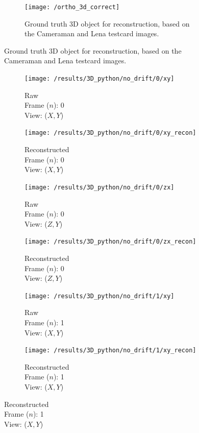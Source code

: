 \begin{figure}
    \begin{subfigure}[t]{\linewidth}
        \centering
        \texttt{[image: /ortho\_3d\_correct]}
        \caption{Ground truth \gls{3D} object for reconstruction, based on the Cameraman and Lena testcard images.}
        \label{fig:ortho_3d_correct}
    \end{subfigure}
\end{figure}
\begin{figure}
\ContinuedFloat
    \begin{subfigure}[t]{0.2\linewidth}
        \centering
        \texttt{[image: /results/3D\_python/no\_drift/0/xy]}\caption{Raw\\Frame (\(n\)): 0\\View: (\(X,Y\))}
    \end{subfigure}\hfill
    \begin{subfigure}[t]{0.2\linewidth}
        \centering
        \texttt{[image: /results/3D\_python/no\_drift/0/xy\_recon]}\caption{Reconstructed\\Frame (\(n\)): 0\\View: (\(X,Y\))}
    \end{subfigure}\hfill
    \begin{subfigure}[t]{0.2\linewidth}
        \centering
        \texttt{[image: /results/3D\_python/no\_drift/0/zx]}\caption{Raw\\Frame (\(n\)): 0\\View: (\(Z,Y\))}
    \end{subfigure}\hfill
    \begin{subfigure}[t]{0.2\linewidth}
        \centering
        \texttt{[image: /results/3D\_python/no\_drift/0/zx\_recon]}\caption{Reconstructed\\Frame (\(n\)): 0\\View: (\(Z,Y\))}
    \end{subfigure}
    \begin{subfigure}[t]{0.2\linewidth}
        \centering
        \texttt{[image: /results/3D\_python/no\_drift/1/xy]}\caption{Raw\\Frame (\(n\)): 1\\View: (\(X,Y\))}
    \end{subfigure}\hfill
    \begin{subfigure}[t]{0.2\linewidth}
        \centering
        \texttt{[image: /results/3D\_python/no\_drift/1/xy\_recon]}\caption{Reconstructed\\Frame (\(n\)): 1\\View: (\(X,Y\))}

\end{subfigure}
\end{figure}

